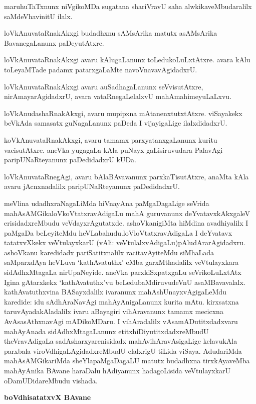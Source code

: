 maruhuTaTxnunx niVgikoMDa sugatana shariVravU saha alwkikaveMbudaralilx saMdeVhavinitU ilalx.

loVkAnuvataRnakAkxgi budadhxnu sAMsArika matutx asAMsArika BavanegaLanunx paDeyutAtxre.

loVkAnuvataRnakAkxgi avaru kAlugaLanunx toLedukoLuLxtAtxre. avara kAlu toLeyaMTade padamx patarxgaLaMte navoVnavavAgidadxrU.

loVkAnuvataRnakAkxgi avaru auSadhagaLanunx seVvisutAtxre, nirAmayarAgidadxrU, avara vataRnegaLelalxvU mahAmahimeyuLaLxvu.

loVkAnudashaRnakAkxgi, avaru mupipxna mAtanenxtutxtAtxre. viSayakekx beVkAda samasatx guNagaLanunx paDeda I vijayigaLige ilalxdidadxrU.

koVkAnuvataRnakAkxgi, avaru tamamx parxyatanxgaLanunx kuritu vacisutAtxre. aneVka yugagaLa kAla puNayx gaLisiruvudara PalavAgi paripUNaRteyanunx paDedidadxrU kUDa.

loVkAnuvataRnegAgi, avaru bAlaBAvavanunx parxkaTisutAtxre, anaMta kAla avaru jAcnxnadalilx paripUNaRteyanunx paDedidadxrU.

meVlina udadhxraNagaLiMda hiVnayAna paMgaDagaLige seVrida mahAsAMGika\break loVkoVtatxravAdigaLu mahA guruvanunx deYvatavxkAkxgaleV erisidadxreMbudu veVdayx\-rAgu\-tatxde. ashoVkanigiMta hiMdina avadhiyalilx I paMgaDa beLeyiteMdu heVLabahudu.\break loVloVtatxravAdigaLa I deYvatavx tatatxvXkekx veVtulayxkarU (vAli: veVtulalxvAdigaLu)\break pAludArarAgidadxru. ashoVkanu karedidadx pariSatitxnalilx racitavAyiteMdu siMhaLada saMparxdAya heVLuva `kathAvatuthx' eMba garxMthadalilx veVtulayxkara sidAdhxMtagaLa nirU\-paNeyide. aneVka parxkiSxpatxgaLu seVrikoLuLxtAtx Igina gAtarxkekx `kathAvatuthx'vu beLedubaMdiruvudeVnU asaMBavavalalx. kathAvatuthxvina BASayxdalilx ivaranunx mahAshUnayxvAgigaLeMdu karedide: idu sAdhAraNavAgi mahAyAnigaLanunx kurita mAtu. kirxsatxna taruvAyada\break kAladalilx ivaru aBayagiri vihAravanunx tamamx mecicxna AvAsasAthxnavAgi mADi\break\-koMDaru. I vihAradalilx vAsamADutitxdadxvaru mahAyAnada sidAdhxMtagaLanunx etitx\-hiDiyutitxdadxreMbudU theVravAdigaLa sadAsharxyarenisidadx mahAvihAravAsigaLige kelavu\-kAla parxbala viroVdhigaLAgidadxreMbudU elalxrigU tiLida viSaya. AdudariMda mahA\-sAMGikariMda sheYlapaMgaDagaLU matutx budadhxna tirxkAyaveMba mahAyAnika BAvane haraDalu hAdiyanunx hadagoLisida veVtulayxkarU oDamUDidareMbudu vishada.

\begin{center}
{\textbf{\Large boVdhisatatxvX BAvane}}
\end{center}

